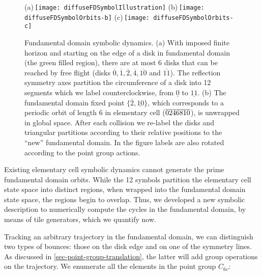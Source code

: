 \begin{figure}[htbp]
  (a)\,\texttt{[image: diffuseFDSymbolIllustration]}
  (b)\,\texttt{[image: diffuseFDSymbolOrbits-b]}
  (c)\,\texttt{[image: diffuseFDSymbolOrbits-c]}
  \caption{\label{fig-fdflights}
  Fundamental domain symbolic dynamics.
  (a) With  imposed finite horizon and starting on the edge of a disk in
  fundamental  domain (the green filled region), there are at most 6
  disks that can be reached by free flight (disks
  $\overline{0},\overline{1},\overline{2},\overline{4},\overline{10}$ and
  $\overline{11}$).
  The reflection symmetry axes partition the circumference of
  a disk into 12 segments which we
  label counterclockwise, from $\underline{0}$ to $\underline{11}$. 
  (b) The fundamental domain fixed point
  $\{\overline{2},\underline{10}\}$, which corresponds to a periodic
  orbit of length 6 in elementary cell (${\overline{0246810}}$), is unwrapped
  in   global space. After each collision we re-label the disks and
  triangular   partitions according to their relative positions to the
  ``new'' fundamental   domain. In the figure labels are also rotated
  according to the point   group actions.
  }
\end{figure}



Existing elementary cell symbolic dynamics cannot generate the prime fundamental domain orbits. While the 12 symbols partition the elementary cell state space into distinct regions, when wrapped into the fundamental domain state space, the regions begin to overlap. Thus, we developed a new symbolic description to numerically compute the cycles in the fundamental domain, by means of tile generators, which we quantify now. 

Tracking an arbitrary trajectory in the fundamental domain, we can distinguish two types of bounces: those on the disk edge and on one of the symmetry lines. As discussed in \ref{sec-point-group-translation}, the latter will add group operations on the trajectory. We enumerate all the elements in the point group $C_{6v}$:

